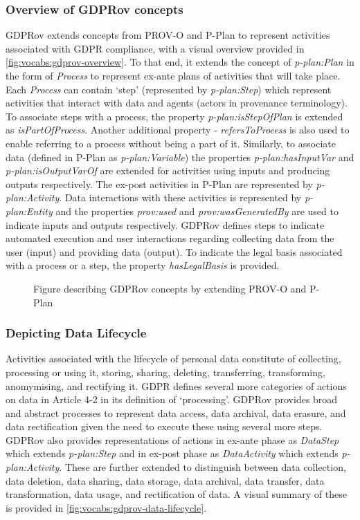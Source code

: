 \subsubsection{Overview of GDPRov concepts}
GDPRov extends concepts from PROV-O and P-Plan to represent activities associated with GDPR compliance, with a visual overview provided in \autoref{fig:vocabs:gdprov-overview}.
To that end, it extends the concept of \textit{p-plan:Plan} in the form of \textit{Process} to represent ex-ante plans of activities that will take place.
Each \textit{Process} can contain `step' (represented by \textit{p-plan:Step}) which represent activities that interact with data and agents (actors in provenance terminology).
To associate steps with a process, the property \textit{p-plan:isStepOfPlan} is extended as \textit{isPartOfProcess}.
Another additional property - \textit{refersToProcess} is also used to enable referring to a process without being a part of it.
Similarly, to associate data (defined in P-Plan as \textit{p-plan:Variable}) the properties \textit{p-plan:hasInputVar} and \textit{p-plan:isOutputVarOf} are extended for activities using inputs and producing outputs respectively.
The ex-post activities in P-Plan are represented by \textit{p-plan:Activity}.
Data interactions with these activities is represented by \textit{p-plan:Entity} and the properties \textit{prov:used} and \textit{prov:wasGeneratedBy} are used to indicate inputs and outputs respectively.
GDPRov defines steps to indicate automated execution and user interactions regarding collecting data from the user (input) and providing data (output).
To indicate the legal basis associated with a process or a step, the property \textit{hasLegalBasis} is provided.
\begin{figure}[htbp]
    \centering
    \missingfigure[figcolor=white]{}
    \caption{Figure describing GDPRov concepts by extending PROV-O and P-Plan}
    \label{fig:vocabs:gdprov-overview}
\end{figure}

\subsubsection{Depicting Data Lifecycle}
Activities associated with the lifecycle of personal data constitute of collecting, processing or using it, storing, sharing, deleting, transferring, transforming, anomymising, and rectifying it. GDPR defines several more categories of actions on data in Article 4-2 in its definition of `processing'.
GDPRov provides broad and abstract processes to represent data access, data archival, data erasure, and data rectification given the need to execute these using several more steps.
GDPRov also provides representations of actions in ex-ante phase as \textit{DataStep} which extends \textit{p-plan:Step} and in ex-post phase as \textit{DataActivity} which extends \textit{p-plan:Activity}.
These are further extended to distinguish between data collection, data deletion, data sharing, data storage, data archival, data transfer, data transformation, data usage, and rectification of data.
A visual summary of these is provided in \autoref{fig:vocabs:gdprov-data-lifecycle}.

